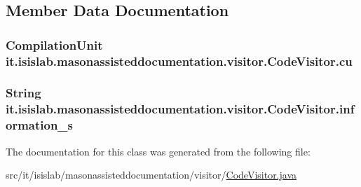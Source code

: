 \subsection{Member Data Documentation}
\hypertarget{classit_1_1isislab_1_1masonassisteddocumentation_1_1visitor_1_1_code_visitor_ad567a4c5516729e6ad3c520b779e5fbf}{
\subsubsection[{cu}]{\setlength{\rightskip}{0pt plus 5cm}Compilation\-Unit it.\-isislab.\-masonassisteddocumentation.\-visitor.\-Code\-Visitor.\-cu\hspace{0.3cm}{\ttfamily [private]}}}\label{classit_1_1isislab_1_1masonassisteddocumentation_1_1visitor_1_1_code_visitor_ad567a4c5516729e6ad3c520b779e5fbf}
\hypertarget{classit_1_1isislab_1_1masonassisteddocumentation_1_1visitor_1_1_code_visitor_a628ab846d2f4de647f171060ebe73774}{
\subsubsection[{information\-\_\-s}]{\setlength{\rightskip}{0pt plus 5cm}String it.\-isislab.\-masonassisteddocumentation.\-visitor.\-Code\-Visitor.\-information\-\_\-s\hspace{0.3cm}{\ttfamily [protected]}}}\label{classit_1_1isislab_1_1masonassisteddocumentation_1_1visitor_1_1_code_visitor_a628ab846d2f4de647f171060ebe73774}


The documentation for this class was generated from the following file\-:\begin{DoxyCompactItemize}
\item 
src/it/isislab/masonassisteddocumentation/visitor/\hyperlink{_code_visitor_8java}{Code\-Visitor.\-java}\end{DoxyCompactItemize}
